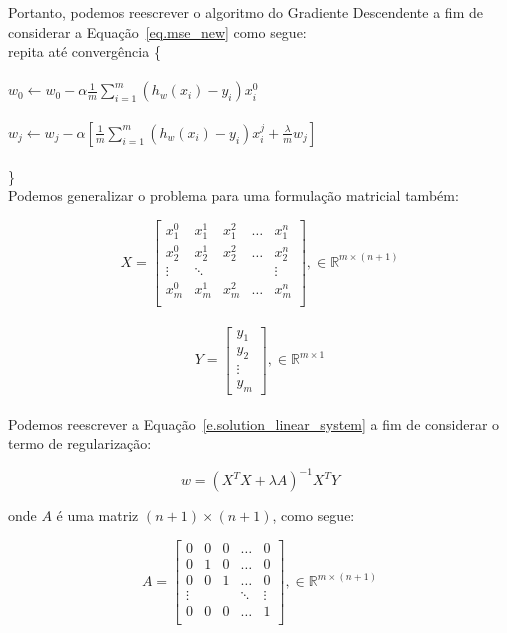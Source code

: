 Portanto, podemos reescrever o algoritmo do Gradiente Descendente a fim de considerar a Equação~\ref{eq.mse_new} como segue:\\

 repita até convergência \{ \\ \\
 \hspace*{25pt} $w_0 \leftarrow w_0 - \alpha \frac{1}{m} \sum_{i=1}^{m}(h_w(x_i) - y_i) x_i^0$ \\~\\
 \hspace*{25pt} $w_j \leftarrow w_j - \alpha [\frac{1}{m} \sum_{i=1}^{m}(h_w(x_i) - y_i)x_i^j + \frac{\lambda}{m}w_j]$ \\ \\
 \hspace*{15pt} \}\\

Podemos generalizar o problema para uma formulação matricial também:

\[X=
  \begin{bmatrix}
    x_1^0 & x_1^1 & x_1^2 & \dots & x_1^n \\
    x_2^0 & x_2^1 & x_2^2 & \dots & x_2^n \\
    \vdots & \ddots & & & \vdots \\
    x_m^0 & x_m^1 & x_m^2 & \dots & x_m^n \\
  \end{bmatrix}, \in \mathbb{R}^{m\times (n+1)}\] \\
  
\[Y=
  \begin{bmatrix}
    y_1 \\
    y_2 \\
    \vdots \\
    y_m
  \end{bmatrix}, \in \mathbb{R}^{m\times1}\] \\
  
Podemos reescrever a Equação~\ref{e.solution_linear_system} a fim de considerar o termo de regularização:

\begin{equation}
w = (X^TX + \lambda A)^{-1} X^TY
\end{equation}

onde $A$ é uma matriz $(n+1)\times(n+1)$, como segue:

\[A=
  \begin{bmatrix}
    0 & 0 & 0 & \dots & 0 \\
    0 & 1 & 0 & \dots & 0 \\
    0 & 0 & 1 & \dots & 0 \\
    \vdots & & & \ddots & \vdots \\
    0 & 0 & 0 & \dots & 1 \\
  \end{bmatrix}, \in \mathbb{R}^{m\times (n+1)}\] \\
  
